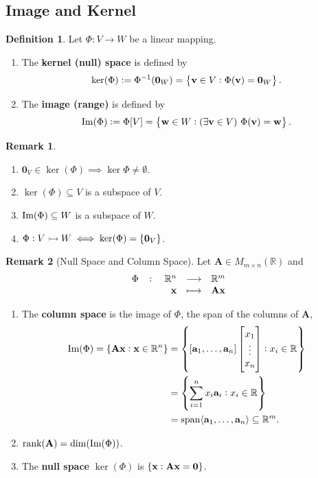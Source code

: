 \documentclass[12pt,openany]{book}
\theoremstyle{definition}
\newtheorem{definition}{Definition}[chapter]
\newtheorem{remark}{Remark}[chapter]
\newcommand{\R}{\mathbb{R}}
\newcommand{\img}{\textnormal{Im}}
\newcommand{\by}{\times}
\newcommand{\Span}[1]{\textnormal{span}\langle #1\rangle}
\newcommand{\rank}{\textnormal{rank}}
\begin{document}
	\newpage
	\subsection{Image and Kernel}
	\begin{tcolorbox}[colframe=defcolor,title={\color{white}\bf Image and Kernel}]
		\begin{definition}
			Let \(\Phi:V\to W\) be a linear mapping. \begin{enumerate}[(1)]
				\item The \textbf{kernel (null) space} is defined by \[
				\ker(\Phi):=\Phi^{-1}(\textbf{0}_W)=\set{\textbf{v}\in V:\Phi(\textbf{v})=\textbf{0}_W}.
				\]
				\item The \textbf{image (range)} is defined by \[
				\img(\Phi):=\Phi[V]=\set{\textbf{w}\in W:(\exists\textbf{v}\in V)\ \Phi(\textbf{v})=\textbf{w}}.
				\]
			\end{enumerate}
		\end{definition}
	\end{tcolorbox}
	\begin{remark}
		\ \begin{enumerate}[(1)]
			\item \(\textbf{0}_V\in\ker(\Phi)\implies\ker\Phi\neq\emptyset\).
			\item \(\ker(\Phi)\subseteq V\) is a subspace of $V$.
			\item \(\img(\Phi)\subseteq W\) is a subspace of $W$.
			\item \(\Phi:V\rightarrowtail W\iff \ker(\Phi)=\set{\textbf{0}_V}\).
		\end{enumerate}
	\end{remark}
	\vspace{8pt}
	\begin{remark}[Null Space and Column Space]
		Let \(\textbf{A}\in M_{m\by n}(\R)\) and $$\fullfunction{\Phi}{\R^n}{\R^m}{\textbf{x}}{\textbf{Ax}}$$
		\begin{enumerate}[(1)]
			\item The \textbf{column space} is the image of \(\Phi\), the span of the columns of \(\textbf{A}\),\begin{align*}
				\img(\Phi)=\set{\textbf{A}\textbf{x}:\textbf{x}\in\R^n}&=\set{\sbr{\textbf{a}_1,\dots,\textbf{a}_n}\begin{bmatrix}
						x_1\\ \vdots\\ x_n
					\end{bmatrix}:x_i\in\R}\\
				&=\set{\sum_{i=1}^nx_i\textbf{a}_i:x_i\in\R}\\
				&=\Span{\textbf{a}_1,\dots,\textbf{a}_n}\subseteq\R^m.
			\end{align*}
			\item \(\rank(\textbf{A})=\dim(\img(\Phi))\).
			\item The \textbf{null space} \(\ker(\Phi)\) is $\set{\textbf{x}:\textbf{Ax}=\textbf{0}}$.
		\end{enumerate}
	\end{remark}
\end{document}
